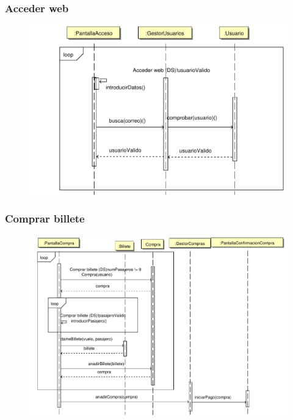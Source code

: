 \documentclass[11pt, a4paper, twoside, titlepage]{article}
\begin{document}
			\subsubsection{Acceder web}
				\begin{figure}[H]\centering
					\includegraphics[scale=.7]{diagramas/accederweb.pdf}
				\end{figure}

			\subsubsection{Comprar billete}
				\begin{figure}[H]\centering
					\includegraphics[scale=.67]{diagramas/comprarbillete.pdf}
				\end{figure}
\end{document}
